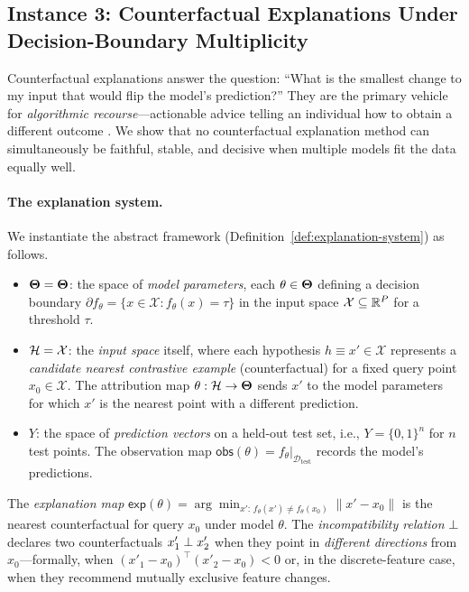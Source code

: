 \subsection{Instance 3: Counterfactual Explanations Under Decision-Boundary
  Multiplicity}
\label{sec:instance-counterfactual}

Counterfactual explanations answer the question: ``What is the smallest change
to my input that would flip the model's prediction?''  They are the primary
vehicle for \emph{algorithmic recourse}---actionable advice telling an
individual how to obtain a different outcome \citep{ustun2019actionable,
karimi2020algorithmic}.  We show that no counterfactual explanation method can
simultaneously be faithful, stable, and decisive when multiple models fit the
data equally well.

\paragraph{The explanation system.}
We instantiate the abstract framework
(Definition~\ref{def:explanation-system}) as follows.
\begin{itemize}
  \item $\mathbf{\Theta} = \mathbf{\Theta}$: the space of \emph{model parameters},
    each $\theta \in \mathbf{\Theta}$ defining a decision boundary
    $\partial f_\theta = \{x \in \mathcal{X} : f_\theta(x) = \tau\}$ in the
    input space $\mathcal{X} \subseteq \mathbb{R}^P$ for a threshold $\tau$.
  \item $\mathcal{H} = \mathcal{X}$: the \emph{input space} itself, where each
    hypothesis $h \equiv x' \in \mathcal{X}$ represents a \emph{candidate
    nearest contrastive example} (counterfactual) for a fixed query point
    $x_0 \in \mathcal{X}$.  The attribution map $\theta: \mathcal{H} \to \mathbf{\Theta}$ sends
    $x'$ to the model parameters for which $x'$ is the nearest point with a
    different prediction.
  \item $Y$: the space of \emph{prediction vectors} on a held-out test set,
    i.e., $Y = \{0, 1\}^n$ for $n$ test points.  The observation map
    $\mathsf{obs}(\theta) = f_\theta|_{\mathcal{D}_{\mathrm{test}}}$ records
    the model's predictions.
\end{itemize}
The \emph{explanation map} $\mathsf{exp}(\theta) = \arg\min_{x' :\,
f_\theta(x') \neq f_\theta(x_0)} \|x' - x_0\|$ is the nearest counterfactual
for query $x_0$ under model $\theta$.  The \emph{incompatibility relation}
$\perp$ declares two counterfactuals $x'_1 \perp x'_2$ when they point in
\emph{different directions} from $x_0$---formally, when
$(x'_1 - x_0)^\top (x'_2 - x_0) < 0$ or, in the discrete-feature case, when
they recommend mutually exclusive feature changes.

